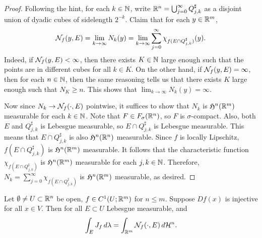 \documentclass[a4paper]{article}
\renewcommand{\cupinfj}{\bigcup_{j=0}^\infty}
\renewcommand{\suminfj}{\sum_{j=0}^\infty}
\begin{document}
\begin{proof}
  Following the hint, for each $k \in \mathbb{N}$, write $\R^n = \cupinfj Q_{j,
        k}^\sharp$ as a disjoint union of dyadic cubes of sidelength $2^{-k}$.
  Claim that for each $y \in \mathbb{R}^m$,
  \[
    \mathcal{N}_f (y, E) = \lim_{k \to \infty} N_k(y)
    = \lim_{k \to \infty} \sum_{j=0}^\infty \chi_{f(E \cap Q_{j, k}^\sharp)}(y).
  \]
  Indeed, if $\mathcal{N}_f(y, E) < \infty$, then there exists $K \in \mathbb{N}$ large
  enough such that the points are in different cubes for all $k \in K$. On
  the other hand, if $\mathcal{N}_f(y, E) = \infty$, then for each $n \in \mathbb{N}$,
  then the same reasoning tells us that there exists $K$ large enough such
  that $N_K \geq n$. This shows that $\lim_{k \to \infty} N_k(y) =
  \infty$.

  Now since $N_k \to \mathcal{N}_f(\cdot, E)$ pointwise, it suffices to show
  that $N_k$ is $\mathfrak{H}^n(\mathbb{R}^m)$ measurable for each $k \in \mathbb{N}$. Note that
  $F \in F_\sigma(\mathbb{R}^n)$, so $F$ is $\sigma$-compact. Also, both $E$ and $Q_{j,
  k}^\sharp$ is Lebesgue measurable, so $E \cap Q_{j, k}^\sharp$ is
  Lebesgue measurable. This means that $E \cap Q_{j, k}^\sharp$ is also
  $\mathfrak{H}^n(\mathbb{R}^n)$ measurable. Since $f$ is locally Lipschitz, $f(E \cap
  Q_{j, k}^\sharp)$ is $\mathfrak{H}^n(\mathbb{R}^m)$ measurable. It follows that the
  characteristic function $\chi_{f(E \cap Q_{j, k}^\sharp)}$ is $\mathfrak{H}^n
  (\mathbb{R}^m)$ measurable for each $j, k \in \mathbb{N}$. Therefore, $N_k = \suminfj
  \chi_{f(E \cap Q_{j, k}^\sharp)}$ is $\mathfrak{H}^n(\mathbb{R}^m)$ measurable, as
  desired.
\end{proof}

\begin{lemma}
  Let $\emptyset \neq U \subset \mathbb{R}^n$ be open, $f \in C^1 (U ; \mathbb{R}^m)$ for
  $n \leq m$. Suppose $Df(x)$ is injective for all $x \in V$. Then for all
  $E \subset U$ Lebesgue measurable, and
  \[
    \int_E J_f \, d \lambda = \int_{\mathbb{R}^m} \mathcal{N}_f (\cdot, E) \, d \mathcal{H}^n.
  \]
\end{lemma}
\end{document}
